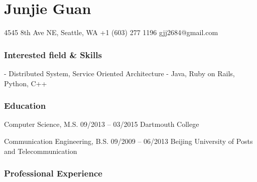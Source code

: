 \documentclass{tccv}
\begin{document}
\part{Junjie Guan}
	
\begin{multicols}{2}

\personal
    {4545 8th Ave NE, Seattle, WA}
    {+1 (603) 277 1196}
    {gjj2684@gmail.com}

\section{Interested field \& Skills}
- Distributed System, Service Oriented Architecture	
- Java, Ruby on Rails, Python, C++



\section{Education}

\begin{yearlist}

\item[Computer Science, M.S.]{09/2013 -- 03/2015}
     {Dartmouth College}

\item[Communication Engineering, B.S.]{09/2009 -- 06/2013}
     {Beijing University of Posts and Telecommunication}

\end{yearlist}






\end{multicols}















\section{Professional Experience}
\end{document}
